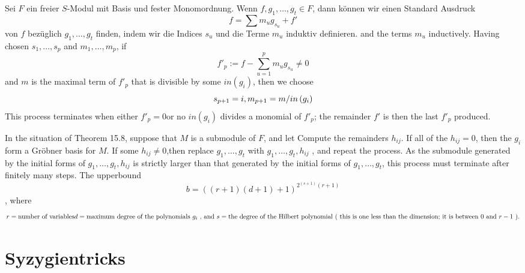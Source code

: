 \documentclass{article}
\begin{document}
\begin{algo}
	Sei 
	\( F \)
	ein freier 
	\( S\)-Modul
	mit Basis und fester Monomordnung.
	Wenn
	\( f,g_1,\dots,g_t \in F \),
	dann k\"onnen wir einen Standard Ausdruck
	\[
                f=\sum m_u g_{s_u} +f'
	\]
	von
	\( f \)
	bez\"uglich 
	\( g_1,\dots,g_t \)
	finden,
	indem wir die Indices
	\( s_{u} \)
	und die Terme
	\(m_{u} \)
	induktiv definieren.
	{\color{red}
and the terms \(m_u\) inductively.
Having chosen
\( s_1,\dots,s_p \)
and
\( m_1,\dots,m_p\),
if
\[
f'_p:=f-\sum_{u=1}^{p} m_u g_{s_u} \neq 0
\]
and \( m \) is the maximal term of \(f'_p \) that is divisible by some \( in\left( g_i \right) \),
then we choose
\[
s_{p+1}=i , \\
m_{p+1}=m / in\left( g_i \right)
\]
This process terminates when either
\( f'_p=0 \)or no \( in\left( g_i \right) \) divides a monomial of
\( f'_p\);
the remainder \(f'\) is then the last \( f'_p \) produced.
}
\end{algo}

{\color{red}



\begin{algo}
In the situation of Theorem 15.8, suppose that \( M \) is a submodule of \( F \), and let
Compute the remainders \( h_{ij} \).
If all of the \( h_{ij}=0 \), then the \( g_i \) form a Gr\"obner basis for \( M \).
If some \( h_{ij} \neq 0\),then replace
\( g_1, \dots,g_t \)
with
\( g_1, \dots,g_t,h_{ij} \)
, and repeat the process.
As the submodule generated by the initial forms of
\(g_1,\dots,g_t,h_{ij} \)
is strictly larger than that generated by the initial forms of
\( g_1, \dots,g_t \),
this process must terminate after finitely many steps.
The upperbound \[
b=\left( \left( r+1 \right)\left( d+1 \right)+1 \right)^{2^{(s+1)}(r+1) }
\],
where
\[
r = \text{number of variables} \\
d = \text{maximum degree of the polynomials \( g_i\) , and } \\
s = \text{the degree of the Hilbert polynomial ( this is one less than the dimension; it is between \( 0 \) and \(r-1\) ).}
\]
\end{algo}
}
\section{Syzygientricks}
\end{document}
